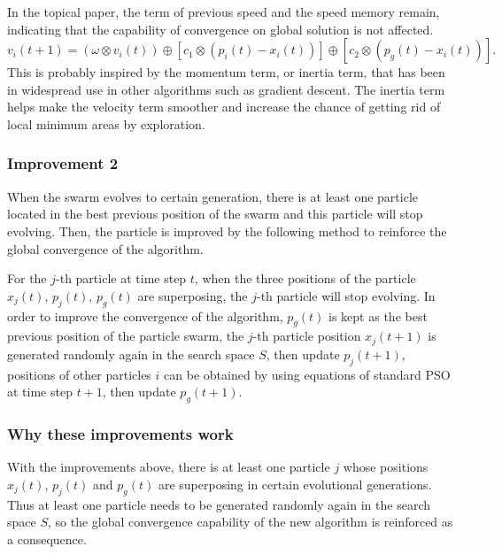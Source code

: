 \documentclass{IEEEtran}
\begin{document}
{{{            In the topical paper, the term of previous speed and the speed memory remain, indicating that the capability of convergence on global solution is not affected.
            $$v_i(t+1) = (\omega \otimes v_i(t)) \oplus [c_1 \otimes (p_i(t) - x_i(t))] \oplus [c_2 \otimes (p_g(t) - x_i(t))].$$
            This is probably inspired by the momentum term, or inertia term, that has been in widespread use in other algorithms such as gradient descent.
            The inertia term helps make the velocity term smoother and increase the chance of getting rid of local minimum areas by exploration.
        }

        \subsubsection{Improvement 2}
        {
            When the swarm evolves to certain generation, 
            there is at least one particle located in the best previous position of the swarm and this particle will stop evolving. 
            Then, the particle is improved by the following method to reinforce the global convergence of the algorithm.

            For the $j$-th particle at time step $t$, when the three positions of the particle $x_j(t)$, $p_j(t)$, $p_g(t)$ are superposing, the $j$-th particle will stop evolving. 
            In order to improve the convergence of the algorithm, $p_g(t)$ is kept as the best previous position of the particle swarm, 
            the $j$-th particle position $x_j(t+1)$ is generated randomly again in the search space $S$, then update $p_j(t+1)$, 
            positions of other particles $i$ can be obtained by using equations of standard PSO at time step $t+1$, then update $p_g(t+1)$.
        }

        \subsubsection{Why these improvements work}
        {
            With the improvements above, there is at least one particle $j$ whose positions $x_j(t)$, $p_j(t)$ and $p_g(t)$ are superposing in certain evolutional generations. 
            Thus at least one particle needs to be generated randomly again in the search space $S$, so the global convergence capability of the new algorithm is reinforced as a consequence.
        }
    }

}



\end{document}
